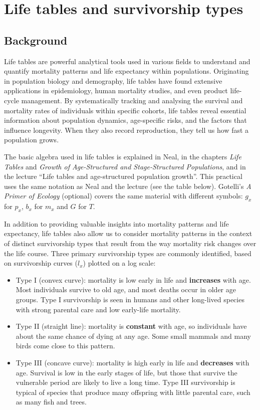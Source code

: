 \documentclass[
  a4paper]{book}
\providecommand{\tightlist}{%
  \setlength{\itemsep}{0pt}\setlength{\parskip}{0pt}}
\begin{document}
\chapter{Life tables and survivorship types}\label{life-tables-and-survivorship-types}

\section{Background}\label{background-7}

Life tables are powerful analytical tools used in various fields to understand and quantify mortality patterns and life expectancy within populations. Originating in population biology and demography, life tables have found extensive applications in epidemiology, human mortality studies, and even product life-cycle management. By systematically tracking and analysing the survival and mortality rates of individuals within specific cohorts, life tables reveal essential information about population dynamics, age-specific risks, and the factors that influence longevity. When they also record reproduction, they tell us how fast a population grows.

The basic algebra used in life tables is explained in Neal, in the chapters \emph{Life Tables} and \emph{Growth of Age-Structured and Stage-Structured Populations}, and in the lecture ``Life tables and age-structured population growth''. This practical uses the same notation as Neal and the lecture (see the table below). Gotelli's \emph{A Primer of Ecology} (optional) covers the same material with different symbols: \(g_x\) for \(p_x\), \(b_x\) for \(m_x\) and \(G\) for \(T\).

In addition to providing valuable insights into mortality patterns and life expectancy, life tables also allow us to consider mortality patterns in the context of distinct survivorship types that result from the way mortality risk changes over the life course. Three primary survivorship types are commonly identified, based on survivorship curves (\(l_x\)) plotted on a log scale:

\begin{itemize}
\tightlist
\item
  Type I (convex curve): mortality is low early in life and \textbf{increases} with age. Most individuals survive to old age, and most deaths occur in older age groups. Type I survivorship is seen in humans and other long-lived species with strong parental care and low early-life mortality.
\item
  Type II (straight line): mortality is \textbf{constant} with age, so individuals have about the same chance of dying at any age. Some small mammals and many birds come close to this pattern.
\item
  Type III (concave curve): mortality is high early in life and \textbf{decreases} with age. Survival is low in the early stages of life, but those that survive the vulnerable period are likely to live a long time. Type III survivorship is typical of species that produce many offspring with little parental care, such as many fish and trees.
\end{itemize}
\end{document}
